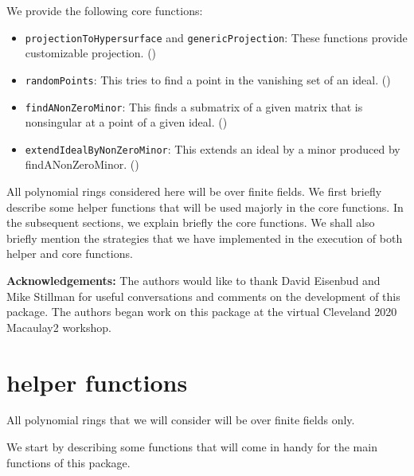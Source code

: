 \documentclass[11pt]{amsart}
\theoremstyle{definition}
\begin{document}
 We provide the following core functions:
 \begin{itemize}
 	\item {\tt projectionToHypersurface} and {\tt genericProjection}: These functions provide customizable projection. ()
 	\item {\tt randomPoints}:  This tries to find a point in the vanishing set of an ideal. ()
    \item {\tt findANonZeroMinor}:  This finds a submatrix of a given matrix that is nonsingular at a point of a given ideal. ()          
	\item {\tt extendIdealByNonZeroMinor}:  This extends an ideal by a minor produced by findANonZeroMinor. ()
	
 	
 \end{itemize}
 
All polynomial rings considered here will be over finite fields. We first briefly describe some helper functions that will be used majorly in the core functions. In the subsequent sections, we explain briefly the core functions. We shall also briefly mention the strategies that we have implemented in the execution of both helper and core functions.

\vspace{1em}
\noindent \textbf{Acknowledgements:} The authors would like to thank David Eisenbud and Mike Stillman for useful conversations and comments on the development of this package.  The authors began work on this package at the virtual Cleveland 2020 Macaulay2 workshop.

\section{helper functions}{\label{helper}}

All polynomial rings that we will consider will be over finite fields only. 

We start by describing some functions that will come in handy for the main functions of this package. 
\end{document}

